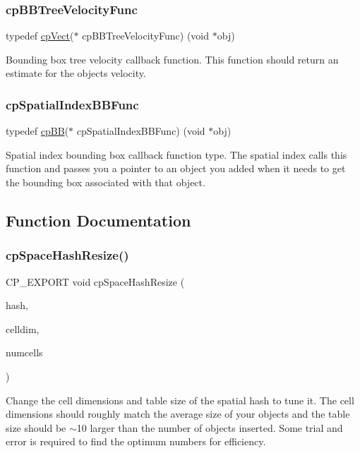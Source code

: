\subsubsection{\texorpdfstring{cp\+B\+B\+Tree\+Velocity\+Func}{cpBBTreeVelocityFunc}}
{\footnotesize\ttfamily typedef \mbox{\hyperlink{structcp_vect}{cp\+Vect}}($\ast$ cp\+B\+B\+Tree\+Velocity\+Func) (void $\ast$obj)}

Bounding box tree velocity callback function. This function should return an estimate for the object\textquotesingle{}s velocity. \mbox{\label{group__cp_spatial_index_gaa8cf991cadcee1fbb6ee9379a0a6e0ea}} 
\subsubsection{\texorpdfstring{cp\+Spatial\+Index\+B\+B\+Func}{cpSpatialIndexBBFunc}}
{\footnotesize\ttfamily typedef \mbox{\hyperlink{structcp_b_b}{cp\+BB}}($\ast$ cp\+Spatial\+Index\+B\+B\+Func) (void $\ast$obj)}

Spatial index bounding box callback function type. The spatial index calls this function and passes you a pointer to an object you added when it needs to get the bounding box associated with that object. 

\subsection{Function Documentation}
\mbox{\label{group__cp_spatial_index_gac6ac718f3e9509abc2c01d256d4217a5}} 
\subsubsection{\texorpdfstring{cp\+Space\+Hash\+Resize()}{cpSpaceHashResize()}}
{\footnotesize\ttfamily C\+P\+\_\+\+E\+X\+P\+O\+RT void cp\+Space\+Hash\+Resize (\begin{DoxyParamCaption}\item[{cp\+Space\+Hash $\ast$}]{hash,  }\item[{\mbox{\hyperlink{group__basic_types_gac1ed65573e035bf892505768c852d8d3}{cp\+Float}}}]{celldim,  }\item[{int}]{numcells }\end{DoxyParamCaption})}

Change the cell dimensions and table size of the spatial hash to tune it. The cell dimensions should roughly match the average size of your objects and the table size should be $\sim$10 larger than the number of objects inserted. Some trial and error is required to find the optimum numbers for efficiency. 